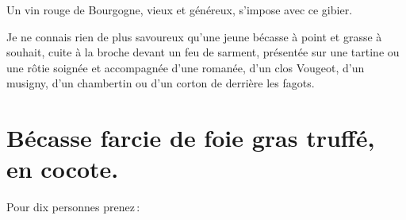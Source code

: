 Un vin rouge de Bourgogne, vieux et généreux, s'impose avec ce gibier.

Je ne connais rien de plus savoureux qu'une jeune bécasse à point et grasse
à souhait, cuite à la broche devant un feu de sarment, présentée sur une tartine
ou une rôtie soignée et accompagnée d'une romanée, d'un clos Vougeot, d'un
musigny, d'un chambertin ou d'un corton de derrière les fagots.

\section*{\centering Bécasse farcie de foie gras truffé, en cocote.}
{}

Pour dix personnes prenez :

